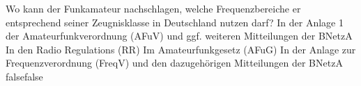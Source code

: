     {Wo kann der Funkamateur nachschlagen, welche Frequenzbereiche er entsprechend seiner Zeugnisklasse in Deutschland nutzen darf?}
    {In der Anlage 1 der Amateurfunkverordnung (AFuV) und ggf. weiteren Mitteilungen der BNetzA}
    {In den Radio Regulations (RR)}
    {Im Amateurfunkgesetz (AFuG)}
    {In der Anlage zur Frequenzverordnung (FreqV) und den dazugehörigen Mitteilungen der BNetzA}
    {false}{false}